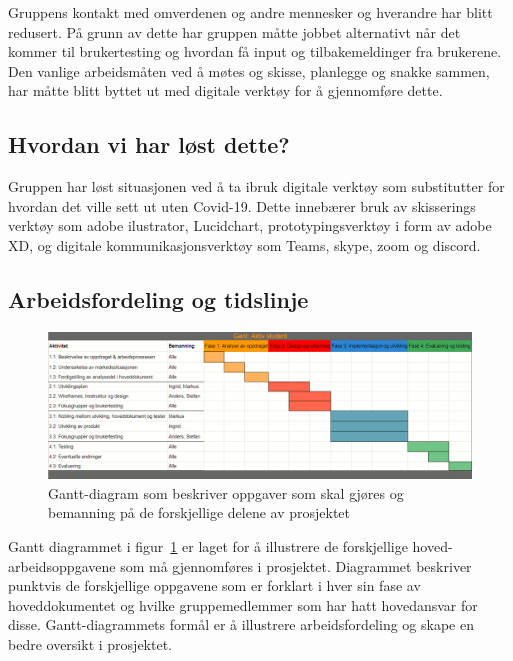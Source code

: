 \documentclass[11pt,a4paper]{report}
\begin{document}
Gruppens kontakt med omverdenen og andre mennesker og hverandre har blitt redusert. På grunn av dette har gruppen måtte jobbet alternativt når det kommer til brukertesting og hvordan få input og tilbakemeldinger fra brukerene. Den vanlige arbeidsmåten ved å møtes og skisse, planlegge og snakke sammen, har måtte blitt byttet ut med digitale verktøy for å gjennomføre dette.

\subsection{Hvordan vi har løst dette?}

Gruppen har løst situasjonen ved å ta ibruk digitale verktøy som substitutter for hvordan det ville sett ut uten Covid-19. Dette innebærer bruk av skisserings verktøy som adobe ilustrator, Lucidchart, prototypingsverktøy i form av adobe XD, og digitale kommunikasjonsverktøy som Teams, skype, zoom og discord. 

\subsection{Arbeidsfordeling og tidslinje}

\begin{figure}[H]
\includegraphics[width=\textwidth]{Illustrasjoner/Gantt.png}
\caption{Gantt-diagram som beskriver oppgaver som skal gjøres og bemanning på de forskjellige delene av prosjektet}
\label{fig:Gantt}
\end{figure}

Gantt diagrammet i figur~\ref{fig:Gantt} er laget for å illustrere de forskjellige hoved-arbeidsoppgavene som må gjennomføres i prosjektet. Diagrammet beskriver punktvis de forskjellige oppgavene som er forklart i hver sin fase av hoveddokumentet og hvilke gruppemedlemmer som har hatt hovedansvar for disse. Gantt-diagrammets formål er å illustrere arbeidsfordeling og skape en bedre oversikt i prosjektet.   
\end{document}
